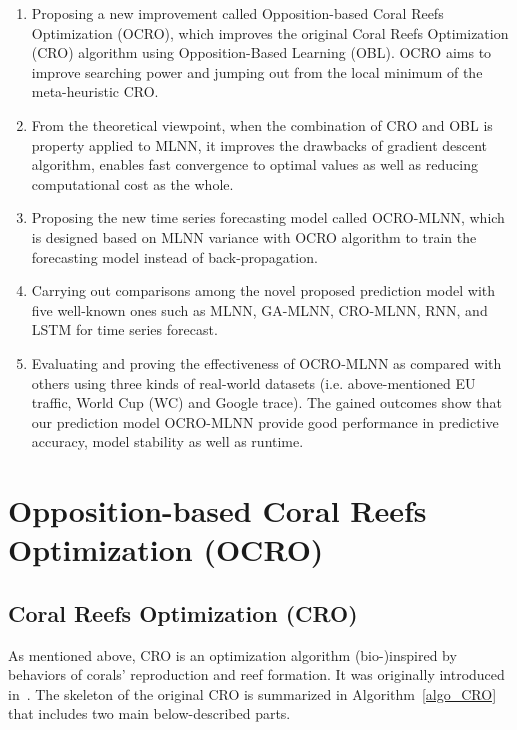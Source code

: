 \documentclass[11pt,twoside]{article}
\begin{document}
\begin{multicols}{2}
\begin{enumerate}
	\item Proposing a new improvement called Opposition-based Coral Reefs Optimization (OCRO), which improves the original Coral Reefs Optimization (CRO) algorithm using Opposition-Based Learning (OBL). OCRO aims to improve searching power and jumping out from the local minimum of the meta-heuristic CRO.
	\item From the theoretical viewpoint, when the combination of CRO and OBL is property applied to MLNN, it improves the drawbacks of gradient descent algorithm, enables fast convergence to optimal values as well as reducing computational cost as the whole.
	\item Proposing the new time series forecasting model called OCRO-MLNN, which is designed based on MLNN variance with OCRO algorithm to train the forecasting model instead of back-propagation. 
	\item Carrying out comparisons among the novel proposed prediction model with five well-known ones such as MLNN, GA-MLNN, CRO-MLNN, RNN, and LSTM for time series forecast.

	\item Evaluating and proving the effectiveness of OCRO-MLNN as compared with others using three kinds of real-world datasets (i.e. above-mentioned EU traffic, World Cup (WC) and Google trace). The gained outcomes show that our prediction model OCRO-MLNN provide good performance in predictive accuracy, model stability as well as runtime.
\end{enumerate}

\section{Opposition-based Coral Reefs Optimization (OCRO)}
\label{ocro_mlnn}
\subsection{Coral Reefs Optimization (CRO)}
\label{cro}

As mentioned above, CRO is an optimization algorithm (bio-)inspired by behaviors of corals’ reproduction and reef formation. It was originally introduced in~\citep{ref_salcedo_sanz1}. The skeleton of the original CRO is summarized in Algorithm~\ref{algo_CRO} that includes two main below-described parts.\\


\end{multicols}
\end{document}
